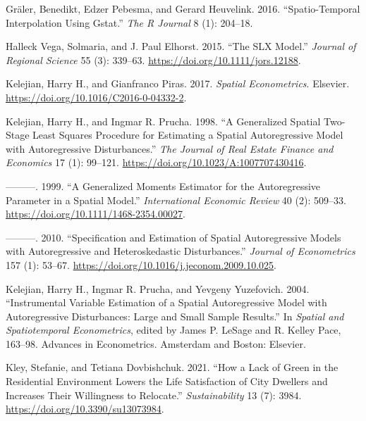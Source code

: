 \documentclass[
  letterpaper,
]{scrbook}
\newlength{\cslhangindent}
\newlength{\cslentryspacingunit} %
\newenvironment{CSLReferences}[2] %
 {%
  \setlength{\parindent}{0pt}
  \ifodd #1
  \let\oldpar\par
  \def\par{\hangindent=\cslhangindent\oldpar}
  \fi
  \setlength{\parskip}{#2\cslentryspacingunit}
 }%
 {}
\begin{document}
\begin{CSLReferences}{1}{0}
\leavevmode{}%
Gräler, Benedikt, Edzer Pebesma, and Gerard Heuvelink. 2016.
{``Spatio-{Temporal Interpolation} Using Gstat.''} \emph{The R Journal}
8 (1): 204--18.

\leavevmode{}%
Halleck Vega, Solmaria, and J. Paul Elhorst. 2015. {``The {SLX
Model}.''} \emph{Journal of Regional Science} 55 (3): 339--63.
\url{https://doi.org/10.1111/jors.12188}.

\leavevmode{}%
Kelejian, Harry H., and Gianfranco Piras. 2017. \emph{Spatial
{Econometrics}}. {Elsevier}.
\url{https://doi.org/10.1016/C2016-0-04332-2}.

\leavevmode{}%
Kelejian, Harry H., and Ingmar R. Prucha. 1998. {``A {Generalized
Spatial Two-Stage Least Squares Procedure} for {Estimating} a {Spatial
Autoregressive Model} with {Autoregressive Disturbances}.''} \emph{The
Journal of Real Estate Finance and Economics} 17 (1): 99--121.
\url{https://doi.org/10.1023/A:1007707430416}.

\leavevmode{}%
---------. 1999. {``A {Generalized Moments Estimator} for the
{Autoregressive Parameter} in a {Spatial Model}.''} \emph{International
Economic Review} 40 (2): 509--33.
\url{https://doi.org/10.1111/1468-2354.00027}.

\leavevmode{}%
---------. 2010. {``Specification and {Estimation} of {Spatial
Autoregressive Models} with {Autoregressive} and {Heteroskedastic
Disturbances}.''} \emph{Journal of Econometrics} 157 (1): 53--67.
\url{https://doi.org/10.1016/j.jeconom.2009.10.025}.

\leavevmode{}%
Kelejian, Harry H., Ingmar R. Prucha, and Yevgeny Yuzefovich. 2004.
{``Instrumental {Variable Estimation} of a {Spatial Autoregressive
Model} with {Autoregressive Disturbances}: {Large} and {Small Sample
Results}.''} In \emph{Spatial and {Spatiotemporal Econometrics}}, edited
by James P. LeSage and R. Kelley Pace, 163--98. Advances in
{Econometrics}. {Amsterdam and Boston}: {Elsevier}.

\leavevmode{}%
Kley, Stefanie, and Tetiana Dovbishchuk. 2021. {``How a {Lack} of
{Green} in the {Residential Environment Lowers} the {Life Satisfaction}
of {City Dwellers} and {Increases Their Willingness} to {Relocate}.''}
\emph{Sustainability} 13 (7): 3984.
\url{https://doi.org/10.3390/su13073984}.


\end{CSLReferences}
\end{document}
